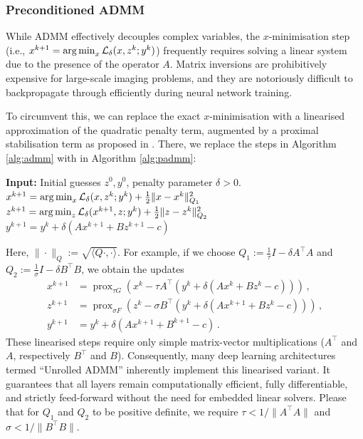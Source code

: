 \subsubsection{Preconditioned ADMM}
While ADMM effectively decouples complex variables, the $x$-minimisation step (i.e., $x^{k+1} = \operatorname*{arg\,min}_{x} \mathcal{L}_\delta(x, z^k; y^k)$) frequently requires solving a linear system due to the presence of the operator $A$. Matrix inversions are prohibitively expensive for large-scale imaging problems, and they are notoriously difficult to backpropagate through efficiently during neural network training. 

To circumvent this, we can replace the exact $x$-minimisation with a linearised approximation of the quadratic penalty term, augmented by a proximal stabilisation term as proposed in \cite{zhang2011unified}. There, we replace the steps in Algorithm \ref{alg:admm} with in Algorithm \ref{alg:padmm}:
\begin{algorithm}
\caption{Preconditioned Alternating Direction Method of Multipliers (ADMM)}\label{alg:padmm}
\begin{algorithmic}
\State \textbf{Input:} Initial guesses $z^0, y^0$, penalty parameter $\delta > 0$.
\State $x^{k+1} = \operatorname*{arg\,min}_{x} \mathcal{L}_\delta(x, z^k; y^k) + \frac12 \| x - x^k \|^2_{Q_1}$ 
\State $z^{k+1} = \operatorname*{arg\,min}_{z} \mathcal{L}_\delta(x^{k+1}, z; y^k) + \frac12 \| z - z^k \|^2_{Q_2}$ 
\State $y^{k+1} = y^k + \delta (Ax^{k+1} + Bz^{k+1} - c)$ 
\EndFor
\end{algorithmic}
\end{algorithm}
Here, $\| \cdot \|_Q := \sqrt{\langle Q \cdot, \cdot\rangle}$. For example, if we choose $Q_1 := \frac{1}{\tau} I - \delta A^\top A$ and $Q_2 := \frac{1}{\sigma} I - \delta B^\top B$, we obtain the updates
\begin{align*}
    x^{k+1} &= \operatorname{prox}_{\tau G} \left( x^k - \tau A^\top (y^k + \delta (A x^k + B z^k - c)) \right) \, , \\
    z^{k+1} &= \operatorname{prox}_{\sigma F} \left( z^k - \sigma B^\top (y^k + \delta (A x^{k+1} + B z^k - c)) \right) \, , \\
    y^{k + 1} &= y^k + \delta (A x^{k + 1} + B^{k + 1} - c) \, .
\end{align*}
These linearised steps require only simple matrix-vector multiplications ($A^\top$ and $A$, respectively $B^\top$ and $B$). Consequently, many deep learning architectures termed ``Unrolled ADMM'' inherently implement this linearised variant. It guarantees that all layers remain computationally efficient, fully differentiable, and strictly feed-forward without the need for embedded linear solvers. Please that for $Q_1$ and $Q_2$ to be positive definite, we require $\tau < 1/\| A^\top A \|$ and $\sigma < 1/\| B^\top B \|$.

